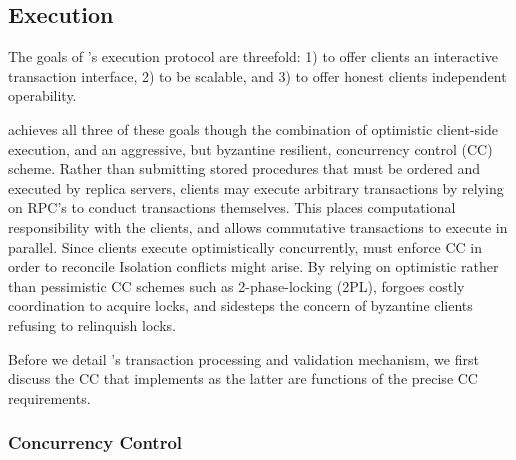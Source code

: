 \subsection{Execution}
The goals of \sys{}'s execution protocol are threefold: 1) to offer clients an interactive transaction interface, 2) to be scalable, and 3) to offer honest clients independent operability.

\sys{} achieves all three of these goals though the combination of optimistic client-side execution, and an aggressive, but byzantine resilient, concurrency control (CC) scheme. Rather than submitting stored procedures that must be ordered and executed by replica servers, \sys clients may execute arbitrary transactions by relying on RPC's to conduct transactions themselves. This places computational responsibility with the clients, and allows commutative transactions to execute in parallel. Since \sys clients execute optimistically concurrently, \sys must enforce CC in order to reconcile Isolation conflicts might arise.
By relying on optimistic rather than pessimistic CC schemes such as 2-phase-locking (2PL), \sys{} forgoes costly coordination to acquire locks, and sidesteps the concern of byzantine clients refusing to relinquish locks. 

Before we detail \sys{}'s transaction processing and validation mechanism, we first discuss the CC that \sys implements as the latter are functions of the precise CC requirements. 
 
\subsubsection{Concurrency Control}


